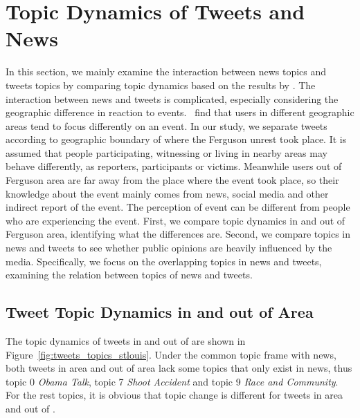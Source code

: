 \section{Topic Dynamics of Tweets and News}
\label{sec:top}

In this section, we mainly examine the interaction between news topics and tweets topics by comparing topic dynamics based on the results by \stlda. The interaction between news and tweets is complicated, especially considering the geographic difference in reaction to events.~ find that users in different geographic areas tend to focus differently on an event. In our study, we separate tweets according to geographic boundary of \stlouis where the Ferguson unrest took place. It is assumed that people participating, witnessing or living in nearby areas may behave differently, as reporters, participants or victims. Meanwhile users out of Ferguson area are far away from the place where the event took place, so their knowledge about the event mainly comes from news, social media and other indirect report of the event. The perception of event can be different from people who are experiencing the event. First, we compare topic dynamics in and out of Ferguson area, identifying what the differences are. Second, we compare topics in news and tweets to see whether public opinions are heavily influenced by the media. Specifically, we focus on the overlapping topics in news and tweets, examining the relation between topics of news and tweets.

\subsection{Tweet Topic Dynamics in and out of \stlouis Area}
\label{subsec:tweet_topic}

The topic dynamics of tweets in and out of \stlouis are shown in Figure~\ref{fig:tweets_topics_stlouis}. Under the common topic frame with news, both tweets in \stlouis area and out of \stlouis area lack some topics that only exist in news, thus topic 0 \emph{Obama Talk}, topic 7 \emph{Shoot Accident} and topic 9 \emph{Race and Community}. For the rest topics, it is obvious that topic change is different for tweets in \stlouis area and out of \stlouis.

